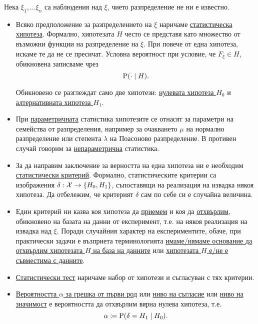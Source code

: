 \documentclass[numbers=endperiod, DIV=15, bibliography=totocnumbered]{scrartcl}
\begin{document}
\begin{definition}[Хипотези]
  Нека $\xi_1, \ldots \xi_n$ са наблюдения над $\xi$, чието разпределение не ни е известно.

  \begin{itemize}
    \item Всяко предположение за разпределението на $\xi$ наричаме \uline{статистическа хипотеза}. Формално, хипотезата $H$ често се представя като множество от възможни функции на разпределение на $\xi$. При повече от една хипотеза, искаме те да не се пресичат. Условна вероятност при условие, че $F_\xi \in H$, обикновена записваме чрез
    \begin{displaymath}
      \operatorname{P}(\cdot \mid H).
    \end{displaymath}

    Обикновено се разглеждат само две хипотези: \uline{нулевата хипотеза $H_0$} и \uline{алтернативната хипотеза $H_1$}.

    \item При \uline{параметричната} статистика хипотезите се отнасят за параметри на семейства от разпределения, например за очакването $\mu$ на нормално разпределение или степента $\lambda$ на Поасоново разпределение. В противен случай говорим за \uline{непараметрична} статистика.

    \item За да направим заключение за верността на една хипотеза ни е необходим \uline{статистически критерий}. Формално, статистическите критерии са изображения $\delta: \mathcal{X} \to \{ H_0, H_1 \}$, съпоставящи на реализация на извадка някоя хипотеза. Да отбележим, че критерият $\delta$ сам по себе си е случайна величина.

    \item Един критерий ни казва коя хипотеза да \uline{приемем} и коя да \uline{отхвърлим}, обикновено на базата на данни от експеримент, т.е. на някоя реализация на извадка над $\xi$. Поради случайния характер на експериментите, обаче, при практически задачи е възприета терминологията \uline{имаме/нямаме основание да отхвърлим хипотезата $H$ на база на данните} или \uline{хипотезата $H$ е/не е съвместима с данните}.

    \item \uline{Статистически тест} наричаме набор от хипотези и съгласуван с тях критерии.

    \item \uline{Вероятността $\alpha$ за грешка от първи род} или \uline{ниво на съгласие} или \uline{ниво на значимост} е вероятността да отхвърлим вярна нулева хипотеза, т.е.
    \begin{displaymath}
      \alpha \coloneqq \operatorname{P}(\delta = H_1 \mid H_0).
    \end{displaymath}


\end{itemize}
\end{definition}
\end{document}
